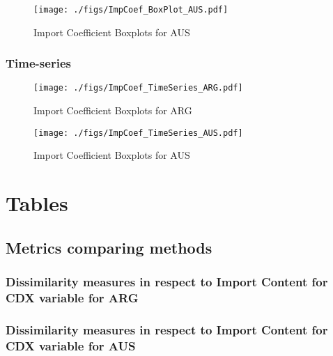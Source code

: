 \documentclass[11pt]{article}
\begin{document}
\begin{figure}[t]
\centering
\texttt{[image: ./figs/ImpCoef\_BoxPlot\_AUS.pdf]}
\caption{Import Coefficient Boxplots for AUS}
\end{figure}
\subsubsection{Time-series}
\label{sec:org1eb0103}


\begin{figure}[t]
\centering
\texttt{[image: ./figs/ImpCoef\_TimeSeries\_ARG.pdf]}
\caption{Import Coefficient Boxplots for ARG}
\end{figure}

\begin{figure}[t]
\centering
\texttt{[image: ./figs/ImpCoef\_TimeSeries\_AUS.pdf]}
\caption{Import Coefficient Boxplots for AUS}
\end{figure}
\section{Tables}
\label{sec:org39f8fd5}

\subsection{Metrics comparing methods}
\label{sec:org0fe4af4}


\subsubsection*{Dissimilarity measures in respect to Import Content for CDX variable for ARG}

\subsubsection*{Dissimilarity measures in respect to Import Content for CDX variable for AUS}

\end{document}
